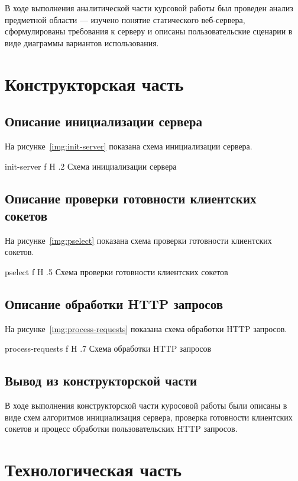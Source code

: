 \documentclass{bmstu}
\begin{document}
В ходе выполнения аналитической части курсовой работы был проведен анализ предметной области --- изучено понятие статического веб-сервера, сформулированы требования к серверу и описаны пользовательские сценарии в виде диаграммы вариантов использования.

\chapter{Конструкторская часть}

\section{Описание инициализации сервера}

На рисунке~\ref{img:init-server} показана схема инициализации сервера. 

    {init-server}
    {f}
    {H}
    {.2\textwidth}
    {Схема инициализации сервера}
    
\pagebreak
\section{Описание проверки готовности клиентских сокетов}
    
На рисунке~\ref{img:pselect} показана схема проверки готовности клиентских сокетов.

    {pselect}
    {f}
    {H}
    {.5\textwidth}
    {Схема проверки готовности клиентских сокетов}

\pagebreak
\section{Описание обработки HTTP запросов}

На рисунке~\ref{img:process-requests} показана схема обработки HTTP запросов.

    {process-requests}
    {f}
    {H}
    {.7\textwidth}
    {Схема обработки HTTP запросов}

\section*{Вывод из конструкторской части}

В ходе выполнения конструкторской части куросовой работы были описаны в виде схем алгоритмов инициализация сервера, проверка готовности клиентских сокетов и процесс обработки пользовательских HTTP запросов.

\chapter{Технологическая часть}
\end{document}
